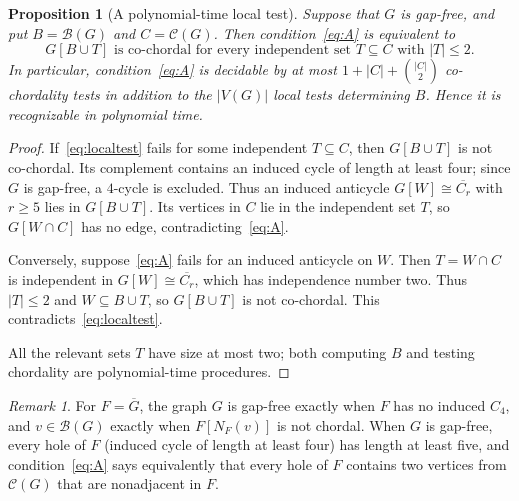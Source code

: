 \documentclass[11pt,a4paper]{article}
\newtheorem{proposition}[theorem]{Proposition}
\theoremstyle{remark}\newtheorem{remark}[theorem]{Remark}
\newcommand{\Bad}{\mathcal B}
\newcommand{\Good}{\mathcal C}
\begin{document}
\begin{proposition}[A polynomial-time local test]\label{prop:localtest}
Suppose that $G$ is gap-free, and put $B=\Bad(G)$ and $C=\Good(G)$. Then condition~\eqref{eq:A} is equivalent to
\begin{equation}\label{eq:localtest}
  G[B\cup T]\text{ is co-chordal for every independent set }
  T\subseteq C\text{ with }|T|\le2.
\end{equation}
In particular, condition~\eqref{eq:A} is decidable by at most
$1+|C|+\binom{|C|}{2}$ co-chordality tests in addition to the $|V(G)|$ local tests determining $B$. Hence it is recognizable in polynomial time.
\end{proposition}
\begin{proof}
If~\eqref{eq:localtest} fails for some independent $T\subseteq C$, then $G[B\cup T]$ is not co-chordal. Its complement contains an induced cycle of length at least four; since $G$ is gap-free, a $4$-cycle is excluded. Thus an induced anticycle $G[W]\cong\overline{C_r}$ with $r\ge5$ lies in $G[B\cup T]$. Its vertices in $C$ lie in the independent set $T$, so $G[W\cap C]$ has no edge, contradicting~\eqref{eq:A}.

Conversely, suppose~\eqref{eq:A} fails for an induced anticycle on $W$. Then $T=W\cap C$ is independent in $G[W]\cong\overline{C_r}$, which has independence number two. Thus $|T|\le2$ and $W\subseteq B\cup T$, so $G[B\cup T]$ is not co-chordal. This contradicts~\eqref{eq:localtest}.

All the relevant sets $T$ have size at most two; both computing $B$ and testing chordality are polynomial-time procedures.
\end{proof}

\begin{remark}\label{rem:complementary}
For $F=\overline G$, the graph $G$ is gap-free exactly when $F$ has no induced $C_4$, and $v\in\Bad(G)$ exactly when $F[N_F(v)]$ is not chordal. When $G$ is gap-free, every hole of $F$ (induced cycle of length at least four) has length at least five, and condition~\eqref{eq:A} says equivalently that every hole of $F$ contains two vertices from $\Good(G)$ that are nonadjacent in $F$.
\end{remark}
\end{document}
